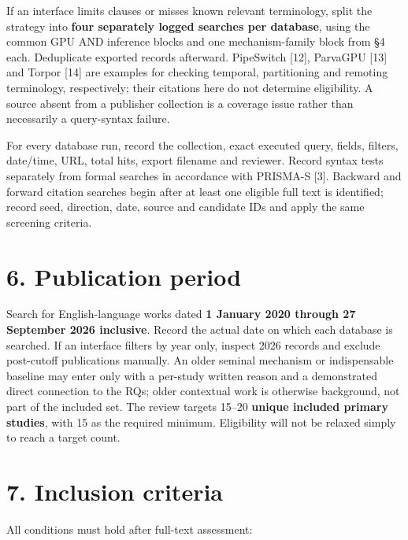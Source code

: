 \documentclass[
  12pt,
]{article}
\begin{document}
If an interface limits clauses or misses known relevant terminology,
split the strategy into \textbf{four separately logged searches per
database}, using the common GPU AND inference blocks and one
mechanism-family block from §4 each. Deduplicate exported records
afterward. PipeSwitch {[}12{]}, ParvaGPU {[}13{]} and Torpor {[}14{]}
are examples for checking temporal, partitioning and remoting
terminology, respectively; their citations here do not determine
eligibility. A source absent from a publisher collection is a coverage
issue rather than necessarily a query-syntax failure.

For every database run, record the collection, exact executed query,
fields, filters, date/time, URL, total hits, export filename and
reviewer. Record syntax tests separately from formal searches in
accordance with PRISMA-S {[}3{]}. Backward and forward citation searches
begin after at least one eligible full text is identified; record seed,
direction, date, source and candidate IDs and apply the same screening
criteria.

\hypertarget{6-publication-period}{%
\section{6. Publication period}\label{6-publication-period}}

Search for English-language works dated \textbf{1 January 2020 through
27 September 2026 inclusive}. Record the actual date on which each
database is searched. If an interface filters by year only, inspect 2026
records and exclude post-cutoff publications manually. An older seminal
mechanism or indispensable baseline may enter only with a per-study
written reason and a demonstrated direct connection to the RQs; older
contextual work is otherwise background, not part of the included set.
The review targets 15--20 \textbf{unique included primary studies}, with
15 as the required minimum. Eligibility will not be relaxed simply to
reach a target count.

\hypertarget{7-inclusion-criteria}{%
\section{7. Inclusion criteria}\label{7-inclusion-criteria}}

All conditions must hold after full-text assessment:
\end{document}
